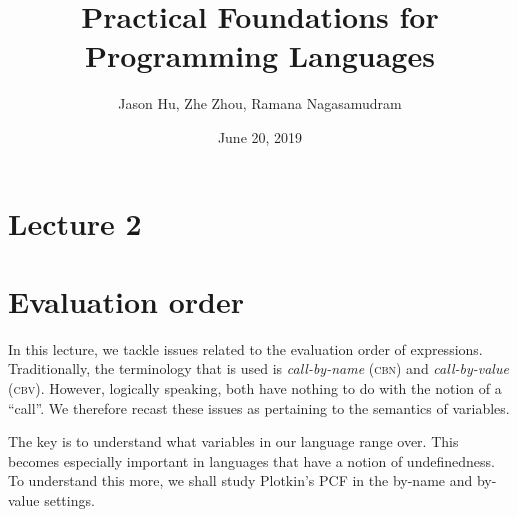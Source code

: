\documentclass[11pt]{article}
\title{Practical Foundations for Programming Languages}
\author{Jason Hu, Zhe Zhou, Ramana Nagasamudram}
\date{June 20, 2019}
\newcommand{\comp}{\texttt{comp}}
\newcommand{\pcf}{\textsc{PCF}}
\newcommand{\Ltt}{\ensuremath{\mathtt{tt}}}
\newcommand{\Lff}{\ensuremath{\mathtt{ff}}}
\newcommand{\Lzero}{\ensuremath{\mathtt{zero}}}
\newcommand{\Lsucc}[1]{\ensuremath{\mathtt{succ}(#1)}}
\newcommand{\Lif}[3]{\ensuremath{\mathtt{if}(#1 ; #2 ; #3)}}
\newcommand{\Lifz}[3]{\ensuremath{\mathtt{ifz}(#1 ; #2 ; #3)}}
\newcommand{\Llam}[3][\tau]{\ensuremath{\lambda[#1](#2 . #3)}}
\newcommand{\Lfix}[3][\tau]{\ensuremath{\mathtt{fix}[#1](#2 . #3)}}
\newcommand{\Lapp}[2]{\ensuremath{\mathtt{ap}(#1, #2)}}
\newcommand{\Lbind}{\ensuremath{\mathtt{bnd}}}
\newcommand{\rret}{\ensuremath{\mathtt{ret}}}
\newcommand{\LBnd}[3][\tau]{\ensuremath{\Lbind[#1](#2; #3)}}
\begin{document}
\maketitle

\section*{Lecture 2}

\section{Evaluation order}

In this lecture, we tackle issues related to the evaluation
order of expressions. Traditionally, the terminology that is used
is \emph{call-by-name} (\textsc{cbn}) and \emph{call-by-value}
(\textsc{cbv}).  However, logically speaking, both have nothing
to do with the notion of a ``call''.  We therefore recast these
issues as pertaining to the semantics of variables.

The key is to understand what variables in our language range over.
This becomes especially important in languages that have a notion
of undefinedness.  To understand this more, we shall study
Plotkin's \pcf{} in the by-name and by-value settings.




\end{document}
